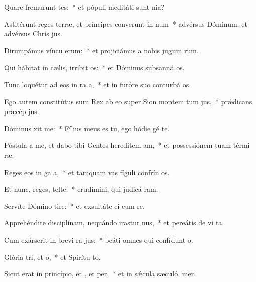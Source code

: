 \item Quare fremurunt tes:~* et pópuli meditáti sunt nia?
\item Astitérunt reges terræ, et príncipes converunt in num~* advérsus Dóminum, et advérsus Chris jus.
\item Dirumpámus víncu erum:~* et projiciámus a nobis jugum rum.
\item Qui hábitat in cælis, irribit os:~* et Dóminus subsanná os.
\item Tunc loquétur ad eos in ra a,~* et in furóre suo conturbá os.
\item Ego autem constitútus sum Rex ab eo super Sion montem tum jus,~* prǽdicans præcép jus.
\item Dóminus xit  me:~* Fílius meus es tu, ego hódie gé te.
\item Póstula a me, et dabo tibi Gentes hereditem am,~* et possessiónem tuam térmi ræ.
\item Reges eos in ga a,~* et tamquam vas fíguli confrín os.
\item Et nunc, reges, telte:~* erudímini, qui judicá ram.
\item Servíte Dómino  tire:~* et exsultáte ei cum re.
\item Apprehéndite disciplínam, nequándo irastur nus,~* et pereátis de vi ta.
\item Cum exárserit in brevi ra jus:~* beáti omnes qui confídunt  o.
\item Glória tri, et o,~* et Spirítu to.
\item Sicut erat in princípio, et , et per,~* et in sǽcula sæculó. men.
